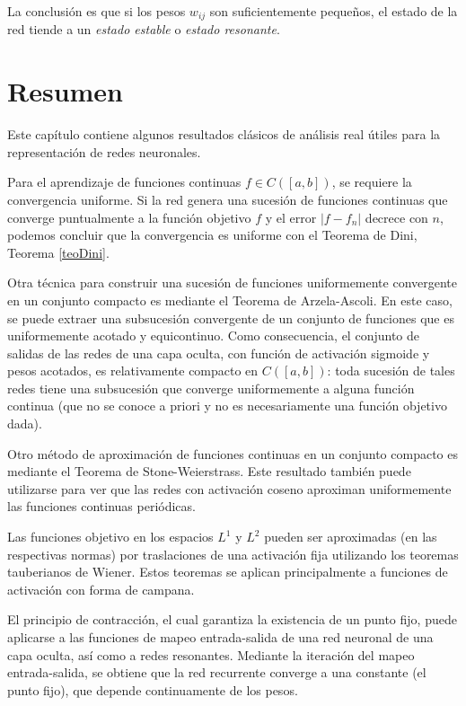 \documentclass[12pt, a4paper]{amsbook}
\theoremstyle{remark}
\theoremstyle{definition}
\numberwithin{section}{chapter}
\numberwithin{subsection}{section}
\numberwithin{equation}{section}
\numberwithin{figure}{chapter}
\begin{document}
La conclusión es que si los pesos $w_{ij}$ son suficientemente pequeños, el estado de la red tiende a un {\em estado estable} o {\em estado resonante}.


\section{Resumen}\label{sec.c7.6}
Este capítulo contiene algunos resultados clásicos de análisis real útiles para la representación de redes neuronales.

Para el aprendizaje de funciones continuas $f \in C([a, b])$, se requiere la convergencia uniforme. Si la red genera una sucesión de funciones continuas que converge puntualmente a la función objetivo $f$ y el error $|f-f_n|$ decrece con $n$, podemos concluir que la convergencia es uniforme con el Teorema de Dini, Teorema \ref{teoDini}.

Otra técnica para construir una sucesión de funciones uniformemente convergente en un conjunto compacto es mediante el Teorema de Arzela-Ascoli. En este caso, se puede extraer una subsucesión convergente de un conjunto de funciones que es uniformemente acotado y equicontinuo. Como consecuencia, el conjunto de salidas de las redes de una capa oculta, con función de activación sigmoide y pesos acotados, es relativamente compacto en $C([a,b])$: toda sucesión de tales redes tiene una subsucesión que converge uniformemente a alguna función continua (que no se conoce a priori y no es necesariamente una función objetivo dada).

Otro método de aproximación de funciones continuas en un conjunto compacto es mediante el Teorema de Stone-Weierstrass. Este resultado también puede utilizarse para ver que las redes con activación coseno aproximan uniformemente las funciones continuas periódicas.

Las funciones objetivo en los espacios $L^1$ y $L^2$ pueden ser aproximadas (en las respectivas normas) por traslaciones de una activación fija utilizando los teoremas tauberianos de Wiener. Estos teoremas se aplican principalmente a funciones de activación con forma de campana.

El principio de contracción, el cual garantiza la existencia de un punto fijo, puede aplicarse a las funciones de mapeo entrada-salida de una red neuronal de una capa oculta, así como a redes resonantes. Mediante la iteración del mapeo entrada-salida, se obtiene que la red recurrente converge a una constante (el punto fijo), que depende continuamente de los pesos.
\end{document}

